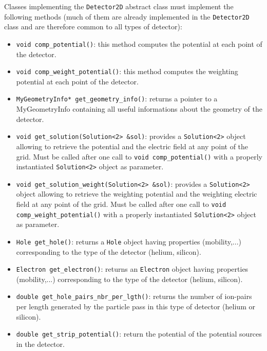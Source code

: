 \documentclass[11pt]{article}
\begin{document}
\newpage
		Classes	implementing the \texttt{Detector2D} abstract class must implement the
		following methods (much of them are already implemented in the \texttt{Detector2D}
		class and are therefore common to all types of detector):
		\begin{itemize}
			\item \lstinline{void comp_potential()}: this method computes the potential
			at each point of the detector.
			\item \lstinline{void comp_weight_potential()}: this method computes the
			weighting potential	at each point of the detector.
			\item \lstinline{MyGeometryInfo* get_geometry_info()}: returns a pointer
			to a MyGeometryInfo containing all useful informations about the geometry
			of the detector.

			\item \lstinline{void get_solution(Solution<2> &sol)}: provides
			a \lstinline{Solution<2>} object allowing to retrieve the potential
			and the electric field at any point of the grid. Must be called
			after one call to \lstinline{void comp_potential()} with a properly instantiated
			\lstinline{Solution<2>} object as parameter.

			\item \lstinline{void get_solution_weight(Solution<2> &sol)}: provides
			a \lstinline{Solution<2>} object allowing to retrieve the weighting potential
			and the weighting electric field at any point of the grid. Must be called
			after one call to \lstinline{void comp_weight_potential()} with a properly instantiated
			\lstinline{Solution<2>} object as parameter.

			\item \lstinline{Hole get_hole()}: returns a \texttt{Hole} object having
			properties (mobility,...) corresponding to the type of the detector (helium, silicon).

			\item \lstinline{Electron get_electron()}: returns an \texttt{Electron} object having
			properties (mobility,...) corresponding to the type of the detector (helium, silicon).

			\item \lstinline{double get_hole_pairs_nbr_per_lgth()}: returns the number
			of ion-pairs per length generated by the particle pass in this
			type of detector (helium or silicon).

			\item \lstinline{double get_strip_potential()}: return the potential of
			the potential sources in the detector.


\end{itemize}
\end{document}

